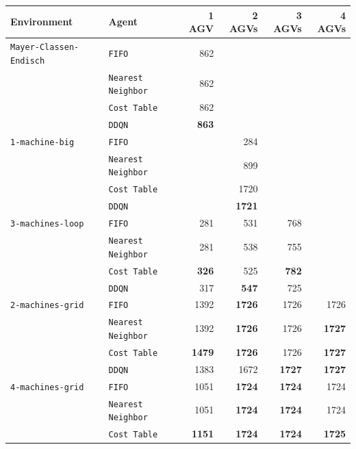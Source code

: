 \documentclass[sn-mathphys]{sn-jnl}
\begin{document}
\begin{table}[ht]
\centering
\bgroup
\def\arraystretch{1.1} %
    
\begin{tabular}{|l|l||r|r|r|r|}
\hline
Environment & Agent & 1 AGV & 2 AGVs & 3 AGVs & 4 AGVs \\
\hline \texttt{Mayer-Classen-Endisch} & \texttt{FIFO}& 862  \quad & & &  \\ 
 & \texttt{Nearest Neighbor} & 862  \quad & & &  \\ 
 & \texttt{Cost Table} & 862  \quad & & &  \\ 
 & \texttt{DDQN} & \textbf{863} \quad & & &  \\ 
\hline \texttt{1-machine-big} & \texttt{FIFO}& & 284  \quad & &  \\ 
 & \texttt{Nearest Neighbor} & & 899  \quad & &  \\ 
 & \texttt{Cost Table} & & 1720  \quad & &  \\ 
 & \texttt{DDQN} & & \textbf{1721} \quad & &  \\ 
\hline \texttt{3-machines-loop} & \texttt{FIFO}& 281  \quad & 531  \quad & 768  \quad &  \\ 
 & \texttt{Nearest Neighbor} & 281  \quad & 538  \quad & 755  \quad &  \\ 
 & \texttt{Cost Table} & \textbf{326} \quad & 525  \quad & \textbf{782} \quad &  \\ 
 & \texttt{DDQN} & 317  \quad & \textbf{547} \quad & 725  \quad &  \\ 
\hline \texttt{2-machines-grid} & \texttt{FIFO}& 1392  \quad & \textbf{1726} \quad & 1726  \quad & 1726  \quad  \\ 
 & \texttt{Nearest Neighbor} & 1392  \quad & \textbf{1726} \quad & 1726  \quad & \textbf{1727} \quad  \\ 
 & \texttt{Cost Table} & \textbf{1479} \quad & \textbf{1726} \quad & 1726  \quad & \textbf{1727} \quad  \\ 
 & \texttt{DDQN} & 1383  \quad & 1672  \quad & \textbf{1727} \quad & \textbf{1727} \quad  \\ 
\hline \texttt{4-machines-grid} & \texttt{FIFO}& 1051  \quad & \textbf{1724} \quad & \textbf{1724} \quad & 1724  \quad  \\ 
 & \texttt{Nearest Neighbor} & 1051  \quad & \textbf{1724} \quad & \textbf{1724} \quad & 1724  \quad  \\ 
 & \texttt{Cost Table} & \textbf{1151} \quad & \textbf{1724} \quad & \textbf{1724} \quad & \textbf{1725} \quad  \\ 

\end{tabular}
\end{table}
\end{document}
